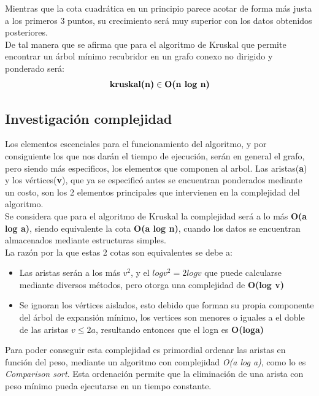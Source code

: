         Mientras que la cota cuadrática en un principio parece acotar de forma más justa a los primeros 3 puntos, su crecimiento será muy superior con los datos obtenidos posteriores.\\
        
        De tal manera que se afirma que para el algoritmo de Kruskal que permite encontrar un árbol mínimo recubridor en un grafo conexo no dirigido y ponderado será:
        \begin{equation*}
            \text{\textbf{kruskal(n)}}\in\text{\textbf{O(n log n)}}
        \end{equation*}

\subsection*{Investigación complejidad}

    Los elementos escenciales para el funcionamiento del algoritmo, y por consiguiente los que nos darán el tiempo de ejecución, serán en general el grafo, pero siendo más especificos, los elementos que componen al arbol. Las aristas(\textbf{a}) y los vértices(\textbf{v}), que ya se especificó antes se encuentran ponderados mediante un costo, son los 2 elementos principales que intervienen en la complejidad del algoritmo.\\
    
    Se considera que para el algoritmo de Kruskal la complejidad será a lo más \textbf{O(a log a)}, siendo equivalente la cota \textbf{O(a log n)}, cuando los datos se encuentran almacenados mediante estructuras simples.\\
    
    La razón por la que estas 2 cotas son equivalentes se debe a:
    \begin{itemize}
        \item Las aristas serán a los más $v^2$, y el $logv^2 = 2logv$ que puede calcularse mediante diversos métodos, pero otorga una complejidad de \textbf{O(log v)}
        \item Se ignoran los vértices aislados, esto debido que forman su propia componente del árbol de expansión mínimo, los vertices son menores o iguales a el doble de las aristas $v\leq 2a$, resultando entonces que el logn es \textbf{O(loga)}
    \end{itemize}
    
    Para poder conseguir esta complejidad es primordial ordenar las aristas en función del peso, mediante un algoritmo con complejidad \textit{O(a log a)}, como lo es \textit{Comparison sort}. Esta ordenación permite que la eliminación de una arista con peso mínimo pueda ejecutarse en un tiempo constante.\\
    
